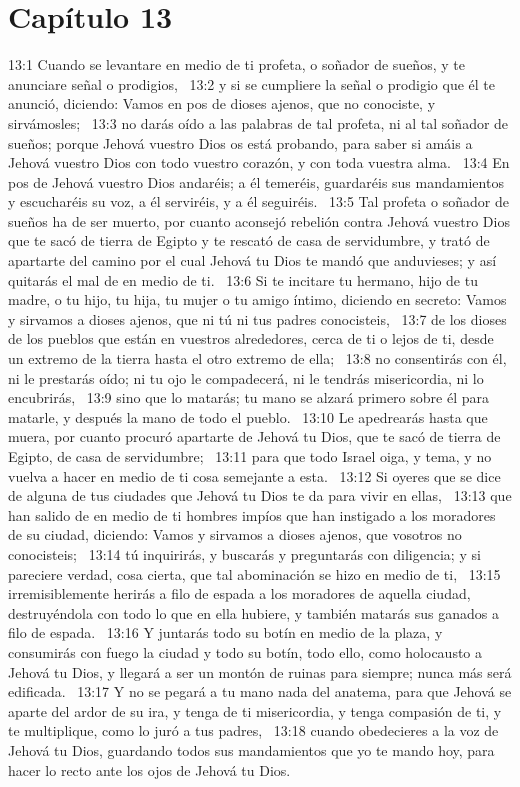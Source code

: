 \section*{Capítulo 13 }

13:1 Cuando se levantare en medio de ti profeta, o soñador de sueños, y te anunciare señal o prodigios,  
13:2 y si se cumpliere la señal o prodigio que él te anunció, diciendo: Vamos en pos de dioses ajenos, que no conociste, y sirvámosles;  
13:3 no darás oído a las palabras de tal profeta, ni al tal soñador de sueños; porque Jehová vuestro Dios os está probando, para saber si amáis a Jehová vuestro Dios con todo vuestro corazón, y con toda vuestra alma.  
13:4 En pos de Jehová vuestro Dios andaréis; a él temeréis, guardaréis sus mandamientos y escucharéis su voz, a él serviréis, y a él seguiréis.  
13:5 Tal profeta o soñador de sueños ha de ser muerto, por cuanto aconsejó rebelión contra Jehová vuestro Dios que te sacó de tierra de Egipto y te rescató de casa de servidumbre, y trató de apartarte del camino por el cual Jehová tu Dios te mandó que anduvieses; y así quitarás el mal de en medio de ti.  
13:6 Si te incitare tu hermano, hijo de tu madre, o tu hijo, tu hija, tu mujer o tu amigo íntimo, diciendo en secreto: Vamos y sirvamos a dioses ajenos, que ni tú ni tus padres conocisteis,  
13:7 de los dioses de los pueblos que están en vuestros alrededores, cerca de ti o lejos de ti, desde un extremo de la tierra hasta el otro extremo de ella;  
13:8 no consentirás con él, ni le prestarás oído; ni tu ojo le compadecerá, ni le tendrás misericordia, ni lo encubrirás,  
13:9 sino que lo matarás; tu mano se alzará primero sobre él para matarle, y después la mano de todo el pueblo.  
13:10 Le apedrearás hasta que muera, por cuanto procuró apartarte de Jehová tu Dios, que te sacó de tierra de Egipto, de casa de servidumbre;  
13:11 para que todo Israel oiga, y tema, y no vuelva a hacer en medio de ti cosa semejante a esta.  
13:12 Si oyeres que se dice de alguna de tus ciudades que Jehová tu Dios te da para vivir en ellas,  
13:13 que han salido de en medio de ti hombres impíos que han instigado a los moradores de su ciudad, diciendo: Vamos y sirvamos a dioses ajenos, que vosotros no conocisteis;  
13:14 tú inquirirás, y buscarás y preguntarás con diligencia; y si pareciere verdad, cosa cierta, que tal abominación se hizo en medio de ti,  
13:15 irremisiblemente herirás a filo de espada a los moradores de aquella ciudad, destruyéndola con todo lo que en ella hubiere, y también matarás sus ganados a filo de espada.  
13:16 Y juntarás todo su botín en medio de la plaza, y consumirás con fuego la ciudad y todo su botín, todo ello, como holocausto a Jehová tu Dios, y llegará a ser un montón de ruinas para siempre; nunca más será edificada.  
13:17 Y no se pegará a tu mano nada del anatema, para que Jehová se aparte del ardor de su ira, y tenga de ti misericordia, y tenga compasión de ti, y te multiplique, como lo juró a tus padres,  
13:18 cuando obedecieres a la voz de Jehová tu Dios, guardando todos sus mandamientos que yo te mando hoy, para hacer lo recto ante los ojos de Jehová tu Dios.  
